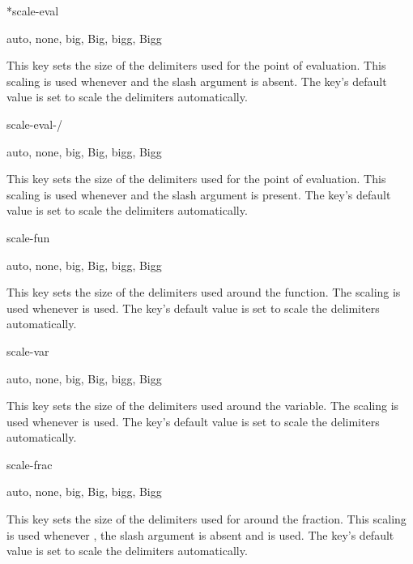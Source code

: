 \documentclass[final,british,10pt]{scrartcl}
\theoremstyle{remark}
\begin{document}
	\begin{option}*{scale-eval}
		\begin{values}[default = auto]
			auto, none, big, Big, bigg, Bigg
		\end{values}
		This key sets the size of the delimiters used for the point of evaluation. This scaling is used whenever  and the slash argument is absent. The key's default value is set to scale the delimiters automatically.
	\end{option}
	
	\begin{option}{scale-eval-/}
		\begin{values}[default = auto]
			auto, none, big, Big, bigg, Bigg
		\end{values}
		This key sets the size of the delimiters used for the point of evaluation. This scaling is used whenever  and the slash argument is present. The key's default value is set to scale the delimiters automatically.
	\end{option}
	
	\begin{option}{scale-fun}
		\begin{values}[default = auto]
			auto, none, big, Big, bigg, Bigg
		\end{values}
		This key sets the size of the delimiters used around the function. The scaling is used whenever  is used. The key's default value is set to scale the delimiters automatically.
	\end{option}
	
	\begin{option}{scale-var}
		\begin{values}[default = auto]
			auto, none, big, Big, bigg, Bigg
		\end{values}
		This key sets the size of the delimiters used around the variable. The scaling is used whenever  is used. The key's default value is set to scale the delimiters automatically.
	\end{option}
	
	\begin{option}{scale-frac}
		\begin{values}[default = auto]
			auto, none, big, Big, bigg, Bigg
		\end{values}
		This key sets the size of the delimiters used for around the fraction. This scaling is used whenever , the slash argument is absent and  is used. The key's default value is set to scale the delimiters automatically.
	\end{option}
	
\end{document}
